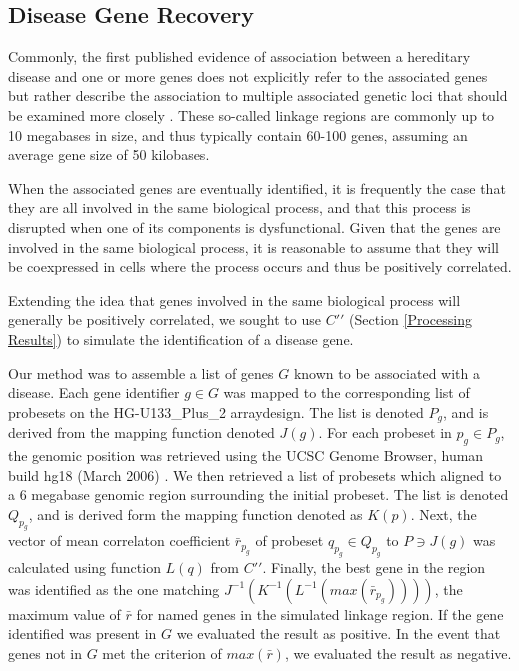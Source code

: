 \documentclass{article}
\begin{document}
\subsection{Disease Gene Recovery}\label{Recovery}

Commonly, the first published evidence of association between a hereditary
disease and one or more genes does not explicitly refer to the associated genes
but rather describe the association to multiple associated genetic loci that
should be examined more closely \cite{joubert,microcephaly}.  These so-called
linkage regions are commonly up to 10 megabases in size, and thus typically
contain 60-100 genes, assuming an average gene size of 50 kilobases.

When the associated genes are eventually identified, it is frequently the case
that they are all involved in the same biological process, and that this
process is disrupted when one of its components is dysfunctional.  Given that
the genes are involved in the same biological process, it is reasonable to
assume that they will be coexpressed in cells where the process occurs and
thus be positively correlated.

Extending the idea that genes involved in the same biological process will
generally be positively correlated, we sought to use $C\prime\prime$ (Section
\ref{Processing Results}) to simulate the identification of a disease gene.

Our method was to assemble a list of genes $G$ known to be associated with a
disease.  Each gene identifier $g \in G$ was mapped to the corresponding list
of probesets on the HG-U133\_Plus\_2 arraydesign.  The list is denoted $P_g$,
and is derived from the mapping function denoted $J(g)$.  For each probeset in
$p_g \in P_g$, the genomic position was retrieved using the UCSC Genome
Browser, human build hg18 (March 2006) \cite{karolchik}.  We then retrieved a
list of probesets which aligned to a 6 megabase genomic region surrounding the
initial probeset.  The list is denoted $Q_{p_g}$, and is derived form the
mapping function denoted as $K(p)$.  Next, the vector of mean correlaton
coefficient $\bar{r}_{p_g}$ of probeset $q_{p_g} \in Q_{p_g}$ to $P \ni J(g)$
was calculated using function $L(q)$ from $C\prime\prime$.  Finally, the best
gene in the region was identified as the one matching
$J^{-1}(K^{-1}(L^{-1}(max(\bar{r}_{p_g}))))$, the maximum value of $\bar{r}$
for named genes in the simulated linkage region.  If the gene identified was
present in $G$ we evaluated the result as positive.  In the event that genes
not in $G$ met the criterion of $max(\bar{r})$, we evaluated the result as
negative.
\end{document}
